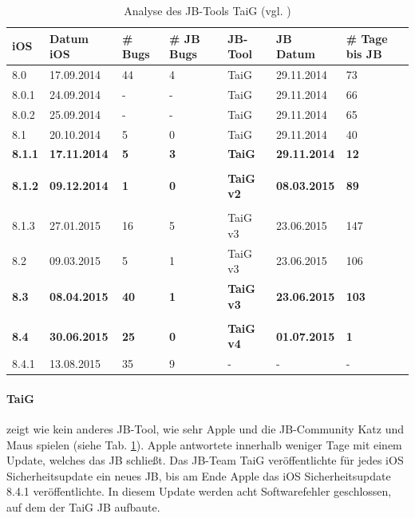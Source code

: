 \begin{table}[htp!]
    \begin{center}
        \begin{tabular}{| p{10mm} | p{22mm} | p{17mm} | p{12mm} | p{18mm} | p{22mm} | p{15mm} |} \hline
            \textbf{iOS} & \textbf{Datum iOS} & \textbf{\# Bugs} & \textbf{\# JB Bugs} & \textbf{JB-Tool} & \textbf{JB Datum} & \textbf{\# Tage bis JB} \\ \hline 
8.0 & 17.09.2014 & 44 & 4 & TaiG & 29.11.2014 & 73  \\ \hline
8.0.1 & 24.09.2014	& - & - & TaiG & 29.11.2014 & 66 \\ \hline
8.0.2 & 25.09.2014 & - & -  & TaiG & 29.11.2014 & 65  \\ \hline
8.1 & 20.10.2014 & 5 & 0 & TaiG & 29.11.2014 & 40  \\ \hline
\textbf{8.1.1} & \textbf{17.11.2014} & \textbf{5} & \textbf{3} & \textbf{TaiG} & \textbf{29.11.2014} & \textbf{12}  \\ \hline
 & & & & & & \\ \hline						
\textbf{8.1.2} & \textbf{09.12.2014} & \textbf{1} & \textbf{0} & \textbf{TaiG v2} & \textbf{08.03.2015} & \textbf{89}  \\ \hline
	 & & & & & & \\ \hline						
8.1.3 & 27.01.2015 & 16 & 5 & TaiG v3 & 23.06.2015 & 147  \\ \hline
8.2  & 09.03.2015 & 5 & 1 & TaiG v3 & 23.06.2015 & 106 \\ \hline
\textbf{8.3} &  \textbf{08.04.2015} & \textbf{40} & \textbf{1} & \textbf{TaiG v3} & \textbf{23.06.2015} & \textbf{103}  \\ \hline
		 & & & & & & \\ \hline					
\textbf{8.4} &  \textbf{30.06.2015} & \textbf{25} & \textbf{0} & \textbf{TaiG v4} & \textbf{01.07.2015} & \textbf{1}  \\ \hline
8.4.1 & 13.08.2015 & 35 & 9 & - & - & -   \\ \hline
        \end{tabular} 
        \caption{Analyse des JB-Tools TaiG (vgl. \cite{Apple[7]}) \protect\footnotemark}
        \label{tab:AnalyseTaig}
    \end{center}
\end{table}

\paragraph{TaiG} zeigt wie kein anderes JB-Tool, wie sehr Apple und die JB-Community Katz und Maus spielen  (siehe Tab. \ref{tab:AnalyseTaig}). Apple antwortete innerhalb weniger Tage mit einem Update, welches das JB schließt. Das JB-Team TaiG veröffentlichte für jedes iOS Sicherheitsupdate ein neues JB, bis am Ende Apple das iOS Sicherheitsupdate 8.4.1 veröffentlichte. In diesem Update werden acht Softwarefehler geschlossen, auf dem der TaiG JB aufbaute. 
 
